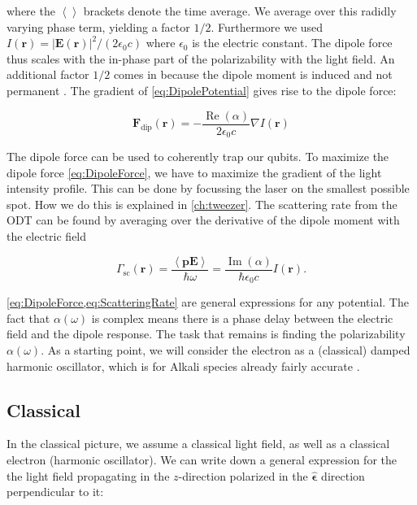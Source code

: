 where the $\left\langle\right\rangle$ brackets denote the time average. We average over this radidly varying phase term, yielding a factor $1/2$. Furthermore we used $I(\mathbf{r}) = |\mathbf{E}(\mathbf{r})|^2/(2\epsilon_0 c)$ where $\epsilon_0$ is the electric constant. The dipole force thus scales with the in-phase part of the polarizability with the light field. An additional factor $1/2$ comes in because the dipole moment is induced and not permanent \cite{Grimm2000}. The gradient of \cref{eq:DipolePotential} gives rise to the dipole force:

\begin{equation}\label{eq:DipoleForce}
	\mathbf{F}_{\text{dip}}(\mathbf{r}) = - \frac{\operatorname{Re}(\alpha)}{2\epsilon_0c}\nabla I(\mathbf{r})
\end{equation}

The dipole force can be used to coherently trap our qubits. To maximize the dipole force \cref{eq:DipoleForce}, we have to maximize the gradient of the light intensity profile. This can be done by focussing the laser on the smallest possible spot. How we do this is explained in \cref{ch:tweezer}. The scattering rate from the ODT can be found by averaging over the derivative of the dipole moment with the electric field \cite{Grimm2000}

\begin{equation}\label{eq:ScatteringRate}
	\Gamma_{\text{sc}}(\mathbf{r}) = \frac{\left\langle \mathbf{p} \mathbf{E} \right\rangle}{\hbar \omega}
	 = \frac{\operatorname{Im}(\alpha)}{\hbar \epsilon_0 c} I(\mathbf{r}).
\end{equation}

\cref{eq:DipoleForce,eq:ScatteringRate} are general expressions for any potential. The fact that $\alpha(\omega)$ is complex means there is a phase delay between the electric field and the dipole response. The task that remains is finding the polarizability $\alpha(\omega)$. As a starting point, we will consider the electron as a (classical) damped harmonic oscillator, which is for Alkali species already fairly accurate \cite{Grimm2000}.

\subsection{Classical}

In the classical picture, we assume a classical light field, as well as a classical electron (harmonic oscillator). We can write down a general expression for the the light field propagating in the $z$-direction polarized in the $\bm{\hat{\epsilon}}$ direction perpendicular to it:

